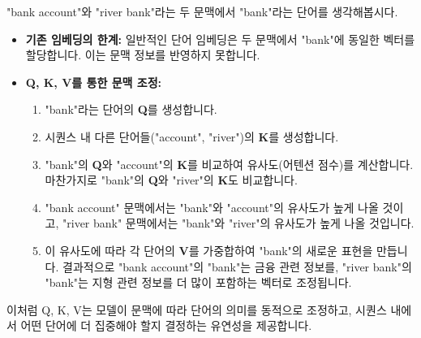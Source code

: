 \documentclass[11pt,a4paper]{article}
\theoremstyle{definition}
\begin{document}
\begin{tcolorbox}[example, title={Q, K, V 예시: 문맥에 따른 단어 의미 조정}]
"bank account"와 "river bank"라는 두 문맥에서 "bank"라는 단어를 생각해봅시다.
\begin{itemize}
    \item \textbf{기존 임베딩의 한계:} 일반적인 단어 임베딩은 두 문맥에서 "bank"에 동일한 벡터를 할당합니다. 이는 문맥 정보를 반영하지 못합니다.
    \item \textbf{Q, K, V를 통한 문맥 조정:}
    \begin{enumerate}
        \item "bank"라는 단어의 \textbf{Q}를 생성합니다.
        \item 시퀀스 내 다른 단어들("account", "river")의 \textbf{K}를 생성합니다.
        \item "bank"의 \textbf{Q}와 "account"의 \textbf{K}를 비교하여 유사도(어텐션 점수)를 계산합니다. 마찬가지로 "bank"의 \textbf{Q}와 "river"의 \textbf{K}도 비교합니다.
        \item "bank account" 문맥에서는 "bank"와 "account"의 유사도가 높게 나올 것이고, "river bank" 문맥에서는 "bank"와 "river"의 유사도가 높게 나올 것입니다.
        \item 이 유사도에 따라 각 단어의 \textbf{V}를 가중합하여 "bank"의 새로운 표현을 만듭니다. 결과적으로 "bank account"의 "bank"는 금융 관련 정보를, "river bank"의 "bank"는 지형 관련 정보를 더 많이 포함하는 벡터로 조정됩니다.
    \end{enumerate}
\end{itemize}
이처럼 Q, K, V는 모델이 문맥에 따라 단어의 의미를 동적으로 조정하고, 시퀀스 내에서 어떤 단어에 더 집중해야 할지 결정하는 유연성을 제공합니다.
\end{tcolorbox}
\end{document}
